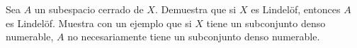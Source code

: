 
\item Sea $A$ un subespacio cerrado de $X$. Demuestra que si $X$ es Lindelöf, entonces $A$ es Lindelöf.  
    Muestra con un ejemplo que si $X$ tiene un subconjunto denso numerable, $A$ no necesariamente tiene un subconjunto denso numerable.

    